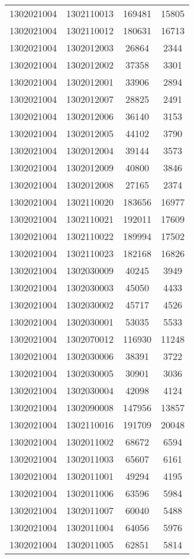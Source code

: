 \begin{longtable}{llcc}
1302021004 & 1302110013 & 169481 & 15805\\
1302021004 & 1302110012 & 180631 & 16713\\
1302021004 & 1302012003 & 26864 & 2344\\
1302021004 & 1302012002 & 37358 & 3301\\
1302021004 & 1302012001 & 33906 & 2894\\
1302021004 & 1302012007 & 28825 & 2491\\
1302021004 & 1302012006 & 36140 & 3153\\
1302021004 & 1302012005 & 44102 & 3790\\
1302021004 & 1302012004 & 39144 & 3573\\
1302021004 & 1302012009 & 40800 & 3846\\
1302021004 & 1302012008 & 27165 & 2374\\
1302021004 & 1302110020 & 183656 & 16977\\
1302021004 & 1302110021 & 192011 & 17609\\
1302021004 & 1302110022 & 189994 & 17502\\
1302021004 & 1302110023 & 182168 & 16826\\
1302021004 & 1302030009 & 40245 & 3949\\
1302021004 & 1302030003 & 45050 & 4433\\
1302021004 & 1302030002 & 45717 & 4526\\
1302021004 & 1302030001 & 53035 & 5533\\
1302021004 & 1302070012 & 116930 & 11248\\
1302021004 & 1302030006 & 38391 & 3722\\
1302021004 & 1302030005 & 30901 & 3036\\
1302021004 & 1302030004 & 42098 & 4124\\
1302021004 & 1302090008 & 147956 & 13857\\
1302021004 & 1302110016 & 191709 & 20048\\
1302021004 & 1302011002 & 68672 & 6594\\
1302021004 & 1302011003 & 65607 & 6161\\
1302021004 & 1302011001 & 49294 & 4195\\
1302021004 & 1302011006 & 63596 & 5984\\
1302021004 & 1302011007 & 60040 & 5488\\
1302021004 & 1302011004 & 64056 & 5976\\
1302021004 & 1302011005 & 62851 & 5814\\

\end{longtable}
